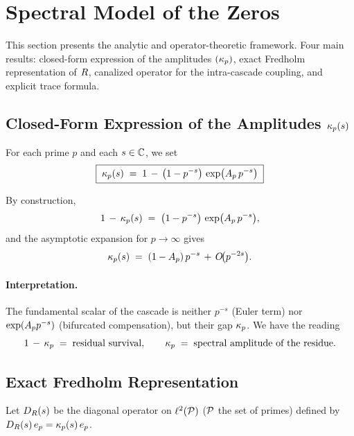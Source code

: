 \section{Spectral Model of the Zeros}
\label{sec:modele_spectral}

This section presents the analytic and operator-theoretic framework. Four
main results: closed-form expression of the amplitudes $(\kappa_p)$,
exact Fredholm representation of $R$, canalized operator for the
intra-cascade coupling, and explicit trace formula.

\subsection{Closed-Form Expression of the Amplitudes $\kappa_p(s)$}
\label{sec:kappa_p}

\begin{definition}
\label{def:kappa_p}
For each prime $p$ and each $s \in \mathbb{C}$, we set
\begin{equation}
\boxed{\;\kappa_p(s) \;=\; 1 \,-\, \big(1 - p^{-s}\big)\,\exp\!\big(A_p\,p^{-s}\big)\;}
\label{eq:kappa_p}
\end{equation}
\end{definition}

\noindent By construction,
\[
1 \,-\, \kappa_p(s) \;=\; \big(1 - p^{-s}\big)\,\exp\!\big(A_p\,p^{-s}\big),
\]
and the asymptotic expansion for $p \to \infty$ gives
\begin{equation}
\kappa_p(s) \;=\; (1 - A_p)\,p^{-s} \,+\, O\!\big(p^{-2s}\big).
\label{eq:kappa_asymp}
\end{equation}

\paragraph{Interpretation.}
The fundamental scalar of the cascade is neither $p^{-s}$ (Euler term)
nor $\exp(A_p p^{-s})$ (bifurcated compensation), but their gap $\kappa_p$.
We have the reading
\[
1 \,-\, \kappa_p \;=\; \text{residual survival},
\qquad
\kappa_p \;=\; \text{spectral amplitude of the residue}.
\]

\subsection{Exact Fredholm Representation}
\label{sec:fredholm}

Let $D_R(s)$ be the diagonal operator on $\ell^{2}(\mathcal{P})$ ($\mathcal{P}$
the set of primes) defined by $D_R(s)\,e_p = \kappa_p(s)\,e_p$.

